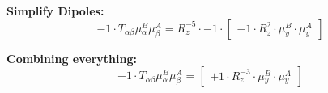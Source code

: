 \documentclass{article}
\begin{document}
\textbf{Simplify Dipoles:}
\begin{equation}
- 1 \cdot T_{\alpha{}\beta{}} \mu{}^{B}_{\alpha{}} \mu{}^{A}_{\beta{}} = R_{z}^{-5} \cdot -1 \cdot  \left[ \begin{array}{c} 
 		- 1 \cdot R_{z}^{2} \cdot \mu{}^{B}_{y} \cdot \mu{}^{A}_{y}
 \end{array}\right] 
\end{equation}


\textbf{Combining everything:}
\begin{equation}
- 1 \cdot T_{\alpha{}\beta{}} \mu{}^{B}_{\alpha{}} \mu{}^{A}_{\beta{}} =  \left[ \begin{array}{c} 
 		+ 1 \cdot R_{z}^{-3} \cdot \mu{}^{B}_{y} \cdot \mu{}^{A}_{y}
 \end{array}\right] 
\end{equation}
\end{document}
